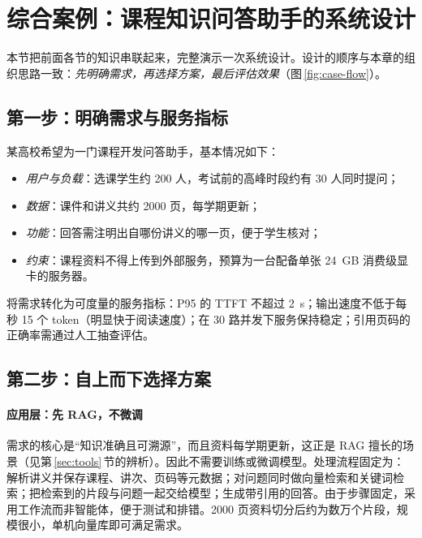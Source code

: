 \section{综合案例：课程知识问答助手的系统设计}
\label{sec:case}

\begin{guide}
\end{guide}

本节把前面各节的知识串联起来，完整演示一次系统设计。设计的顺序与本章的组织思路一致：\emph{先明确需求，再选择方案，最后评估效果}（图\,\ref{fig:case-flow}）。



\subsection{第一步：明确需求与服务指标}

某高校希望为一门课程开发问答助手，基本情况如下：
\begin{itemize}
  \item \emph{用户与负载}：选课学生约 200 人，考试前的高峰时段约有 30 人同时提问；
  \item \emph{数据}：课件和讲义共约 2000 页，每学期更新；
  \item \emph{功能}：回答需注明出自哪份讲义的哪一页，便于学生核对；
  \item \emph{约束}：课程资料不得上传到外部服务，预算为一台配备单张 \SI{24}{GB} 消费级显卡的服务器。
\end{itemize}

将需求转化为可度量的服务指标：P95 的 TTFT 不超过 \SI{2}{s}；输出速度不低于每秒 15 个 token（明显快于阅读速度）；在 30 路并发下服务保持稳定；引用页码的正确率需通过人工抽查评估。

\subsection{第二步：自上而下选择方案}

\paragraph{应用层：先 RAG，不微调} 需求的核心是“知识准确且可溯源”，而且资料每学期更新，这正是 RAG 擅长的场景（见第\,\ref{sec:tools}\,节的辨析）。因此不需要训练或微调模型。处理流程固定为：解析讲义并保存课程、讲次、页码等元数据；对问题同时做向量检索和关键词检索；把检索到的片段与问题一起交给模型；生成带引用的回答。由于步骤固定，采用工作流而非智能体，便于测试和排错。2000 页资料切分后约为数万个片段，规模很小，单机向量库即可满足需求。

